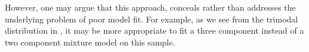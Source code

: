 However, one may argue that this approach, conceals rather than addresses the underlying problem of poor model fit.
For example, as we see from the trimodal distribution in ,
it may be more appropriate to fit a three component instead of a two component mixture model on this sample.







